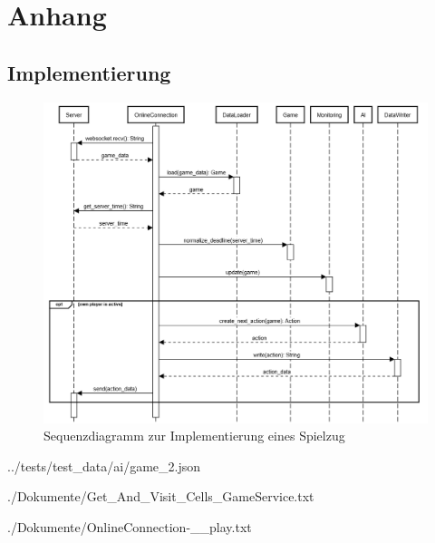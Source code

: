 \chapter{Anhang}
\label{ch:anhang}

\section{Implementierung}
\label{sec:anhang-implementierung}

\begin{figure}[htb]
	\centering
	\includegraphics[width=13.5cm]{Bilder/Sequenzdiagramm_Implementierung_Spielzug.png}
	\caption{Sequenzdiagramm zur Implementierung eines Spielzug}
	\label{fig:sequenzdiagramm-spielzug}
\end{figure}

\begin{minipage}{\textwidth}
	
	{../tests/test_data/ai/game_2.json}
\end{minipage}

\begin{minipage}{\textwidth}
	
	{./Dokumente/Get_And_Visit_Cells_GameService.txt}
	
	{./Dokumente/OnlineConnection-__play.txt}
\end{minipage}